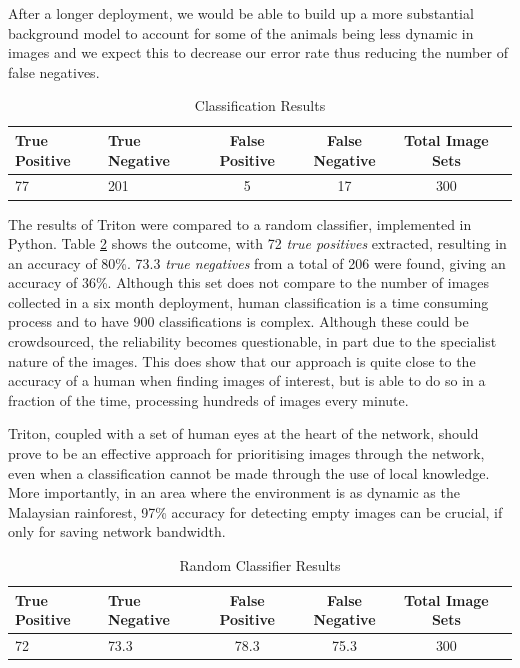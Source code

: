 		After a longer deployment, we would be able to build up a more substantial background model to account for some of the animals being less dynamic in images and we expect this to decrease our error rate thus reducing the number of false negatives. 
		
		\begin{table}
			\hfill{}
			\begin{tabular}{|l|l|c|c|c|c|}
				\hline
					True Positive & True Negative & False Positive  & False Negative & Total Image Sets \\
				\hline
					77 & 201 & 5 & 17 & 300 \\
				\hline
			\end{tabular}
			\hfill{}
			\caption{Classification Results}
			\label{table:processing}
		\end{table}
		
		The results of Triton were compared to a random classifier, implemented in Python. Table \ref{table:random} shows the outcome, with 72 {\it true positives} extracted, resulting in an accuracy of 80\%. 73.3 {\it true negatives} from a total of 206 were found, giving an accuracy of 36\%. Although this set does not compare to the number of images collected in a six month deployment, human classification is a time consuming process and to have 900 classifications is complex. Although these could be crowdsourced, the reliability becomes questionable, in part due to the specialist nature of the images. This does show that our approach is quite close to the accuracy of a human when finding images of interest, but is able to do so in a fraction of the time, processing hundreds of images every minute. 
		
		Triton, coupled with a set of human eyes at the heart of the network, should prove to be an effective approach for prioritising images through the network, even when a classification cannot be made through the use of local knowledge. More importantly, in an area where the environment is as dynamic as the Malaysian rainforest, 97\% accuracy for detecting empty images can be crucial, if only for saving network bandwidth.
		
		\begin{table}
			\hfill{}
			\begin{tabular}{|l|l|c|c|c|c|}
				\hline
					True Positive & True Negative & False Positive  & False Negative & Total Image Sets \\
				\hline
					72 & 73.3 & 78.3 & 75.3 & 300 \\
				\hline
			\end{tabular}
			\hfill{}
			\caption{Random Classifier Results}
			\label{table:random}
		\end{table}			
%	

